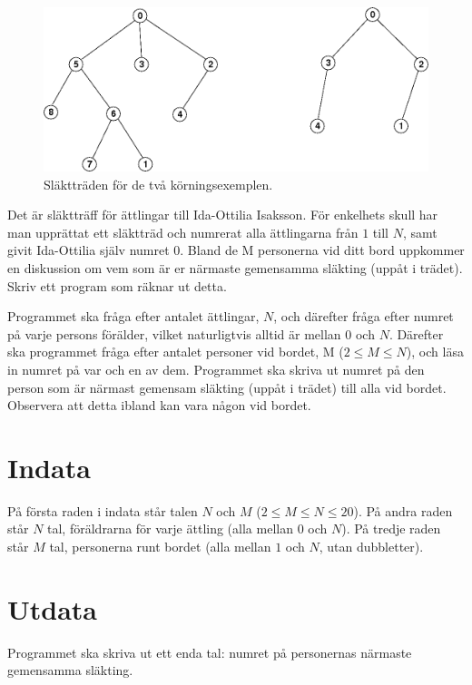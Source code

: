 \begin{figure}[h!]
  \centering
  \includegraphics[width=16cm]{slakttraffen.png}
  \caption{Släktträden för de två körningsexemplen.}
\end{figure}

Det är släktträff för ättlingar till Ida-Ottilia Isaksson.
För enkelhets skull har man upprättat ett släktträd och numrerat alla ättlingarna från $1$ till $N$, samt givit Ida-Ottilia själv numret $0$.
Bland de M personerna vid ditt bord uppkommer en diskussion om vem som är er närmaste gemensamma släkting (uppåt i trädet).
Skriv ett program som räknar ut detta.

Programmet ska fråga efter antalet ättlingar, $N$, och därefter fråga efter numret på varje persons förälder, vilket naturligtvis alltid är mellan $0$ och $N$.
Därefter ska programmet fråga efter antalet personer vid bordet, M ($2 \le M \le N$), och läsa in numret på var och en av dem.
Programmet ska skriva ut numret på den person som är närmast gemensam släkting (uppåt i trädet) till alla vid bordet.
Observera att detta ibland kan vara någon vid bordet.

\section*{Indata}
På första raden i indata står talen $N$ och $M$ ($2 \le M \le N \le 20$).
På andra raden står $N$ tal, föräldrarna för varje ättling (alla mellan $0$ och $N$).
På tredje raden står $M$ tal, personerna runt bordet (alla mellan $1$ och $N$, utan dubbletter).

\section*{Utdata}
Programmet ska skriva ut ett enda tal: numret på personernas närmaste gemensamma släkting.
